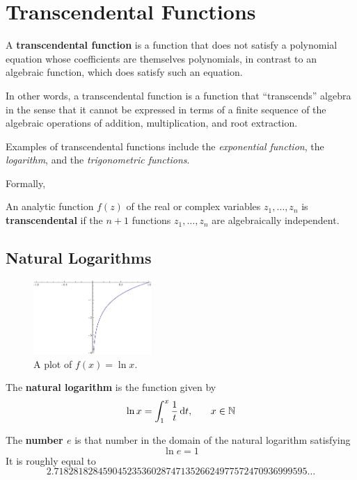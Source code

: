 \chapter{Transcendental Functions}

A \textbf{transcendental function} is a function that does not satisfy a polynomial equation whose coefficients are themselves polynomials, in contrast to an algebraic function, which does satisfy such an equation.

In other words, a transcendental function is a function that ``transcends'' algebra in the sense that it cannot be expressed in terms of a finite sequence of the algebraic operations of addition, multiplication, and root extraction.

Examples of transcendental functions include the \emph{exponential function}, the \emph{logarithm}, and the \emph{trigonometric functions}.

Formally,

\begin{defn}
  An analytic function \(f(z)\) of the real or complex variables \(z_1, \ldots, z_n\) is \textbf{transcendental} if the \(n+1\) functions \(z_1, \ldots, z_n\) are algebraically independent.
  \cite{wiki:transcendental}
\end{defn}

\section{Natural Logarithms}
\begin{figure}[h]
  \begin{center}
    \includegraphics[width=0.4\textwidth]{continuous/transcend/natlog}
  \end{center}
  \caption{A plot of $f(x) =\ln x$.}
  \label{fig:natlog}
\end{figure}

\begin{defn}
  The \textbf{natural logarithm} is the function given by
  \begin{equation}
    \ln x = \int ^{x} _{1} \frac{1}{t} \,\mathrm{d} t \text{,} \qquad x \in \mathbb{N}
  \end{equation}
\end{defn}
\begin{defn}
  The \textbf{number $e$} is that number in the domain of the natural logarithm satisfying
  \[ \ln{e}=1 \]
  It is roughly equal to
  \[2.7182818284590452353602874713526624977572470936999595\ldots\]
\end{defn}
